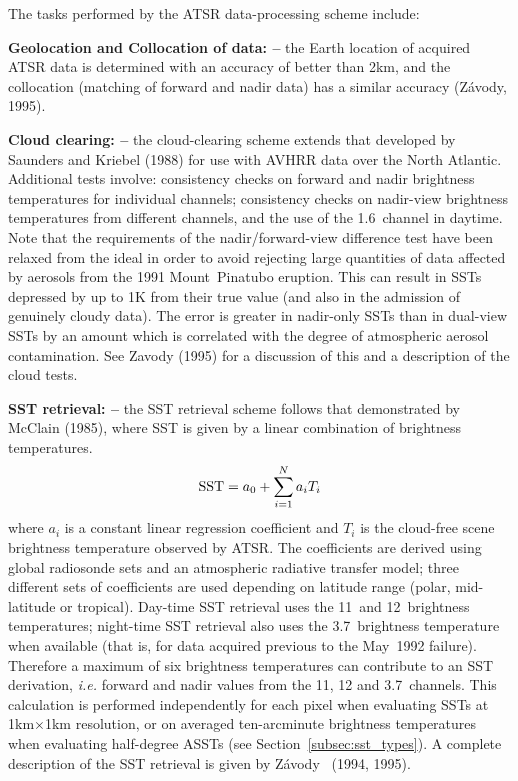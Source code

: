 The tasks performed by the ATSR data-processing scheme include:
\begin{description}
\item {\bf Geolocation and Collocation of data: -- } 
the Earth location of acquired ATSR data is determined with an accuracy 
of better than 2{\thinspace}km, and the collocation (matching of forward 
and nadir data) has a similar accuracy (Z\'{a}vody, 1995).

\item {\bf Cloud clearing: -- }
the cloud-clearing scheme extends that developed by Saunders and 
Kriebel (1988) for use with AVHRR data over the North Atlantic.
Additional tests involve: 
consistency checks on forward and nadir brightness temperatures for 
individual channels; 
consistency checks on nadir-view brightness temperatures from different 
channels, and the use of the 1.6\mic\ channel in daytime.
Note that the requirements of the nadir/forward-view difference test have been 
relaxed from the ideal in order to avoid rejecting large quantities of 
data affected by aerosols from the 1991  Mount~Pinatubo eruption.
This can result in SSTs depressed by up to 1K from their true value
(and also in the admission of genuinely cloudy data). 
The error is greater in nadir-only  SSTs than in dual-view SSTs
by an amount which is correlated with the degree of atmospheric aerosol
contamination.
See Zavody {\etal} (1995) for a discussion of this and a description
of the cloud tests.

\item {\bf SST retrieval: --}
the SST retrieval scheme follows that demonstrated by McClain {\etal} 
(1985), where SST is given by a linear combination of brightness 
temperatures.
$$ {\rm SST} = a_0 + \sum^N_{i=1} a_i T_i$$
where $a_i$ is a constant linear regression coefficient and $T_i$ is the 
cloud-free scene brightness temperature observed by ATSR.
The coefficients are derived using global radiosonde sets and 
an atmospheric radiative transfer model; three different sets of 
coefficients are used depending on latitude range (polar, mid-latitude 
or tropical). 
Day-time SST retrieval uses  the 11\mic\ and 12\mic\ brightness temperatures;
night-time SST retrieval also uses the 3.7\mic\ brightness temperature 
when available (that is, for data acquired previous to the May~1992 failure).
Therefore a maximum of six brightness temperatures can contribute to an
SST derivation, {\sl i.e.\/} forward and nadir values from the 11, 12 
and 3.7\mic\  channels.
This calculation is performed independently for each pixel when
evaluating SSTs at 1{\thinspace}km$\times$1{\thinspace}km resolution,
or on averaged ten-arcminute brightness temperatures 
when evaluating half-degree ASSTs (see Section~\ref{subsec:sst_types}).
A complete description of the SST retrieval is given by
Z\'{a}vody \etal\ (1994, 1995).
\end{description}


